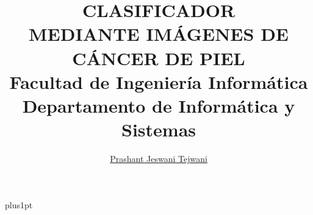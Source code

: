 \documentclass[twoside,11pt]{Latex/Classes/PhDthesisPSnPDF}
\title{%
  CLASIFICADOR \\ MEDIANTE IMÁGENES DE \\ CÁNCER DE PIEL \\
  \large
  \bigskip 
  Facultad de Ingeniería Informática \\
  Departamento de Informática y Sistemas}
\author{\href{prashantjeswani8@gmail.com}{Prashant Jeswani Tejwani}}
\begin{document}
\renewcommand\baselinestretch{1.2}
\baselineskip=18pt plus1pt


\maketitle  %

\frontmatter


\setcounter{secnumdepth}{3} %
\setcounter{tocdepth}{3} %
\renewcommand{\contentsname}{Índice de contenido}
\renewcommand{\listfigurename}{Índice de figuras}
\renewcommand{\listtablename}{Índice de tablas}
\tableofcontents 
\listoffigures
\listoftables  


\mainmatter
\renewcommand{\chaptername}{} %





%
%
%



\renewcommand{\bibname}{Referencias}

\end{document}

